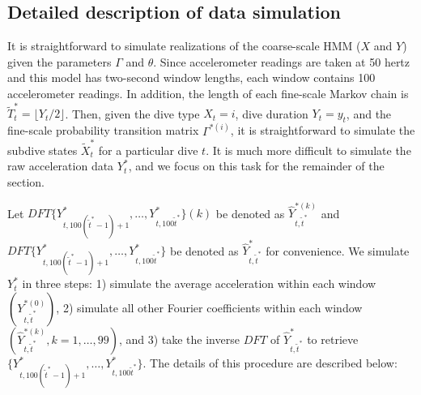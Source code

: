 
\subsection{Detailed description of data simulation}

It is straightforward to simulate realizations of the coarse-scale HMM ($X$ and $Y$) given the parameters $\Gamma$ and $\theta$. Since accelerometer readings are taken at 50 hertz and this model has two-second window lengths, each window contains 100 accelerometer readings. In addition, the length of each fine-scale Markov chain is $\tilde T ^*_t = \lfloor Y_t/2 \rfloor$. Then, given the dive type $X_t = i$, dive duration $Y_t = y_t$, and the fine-scale probability transition matrix $\Gamma^{*(i)}$, it is straightforward to simulate the subdive states $\tilde{X}^*_t$ for a particular dive $t$. It is much more difficult to simulate the raw acceleration data $Y_t^*$, and we focus on this task for the remainder of the section. 

Let $DFT\{Y^*_{t,100(\tilde t^* - 1) + 1},\ldots,Y^*_{t,100\tilde t^*}\}(k)$ be denoted as $\hat{Y}^{*(k)}_{t,\tilde t^*}$ and $DFT\{Y^*_{t,100(\tilde t^* - 1) + 1},\ldots,Y^*_{t,100\tilde t^*}\}$ be denoted as $\hat{Y}^*_{t,\tilde t^*}$ for convenience. We simulate $Y_t^*$ in three steps: 1) simulate the average acceleration within each window $\left(Y^{*(0)}_{t,\tilde t^*}\right)$, 2) simulate all other Fourier coefficients within each window $\left(\hat Y^{*(k)}_{t,\tilde t^*}, k = 1,\ldots,99\right)$, and 3) take the inverse $DFT$ of $\hat{Y}^*_{t,\tilde t^*}$ to retrieve $\{Y^*_{t,100(\tilde t^* - 1) + 1},\ldots,Y^*_{t,100\tilde t^*}\}$. The details of this procedure are described below:

